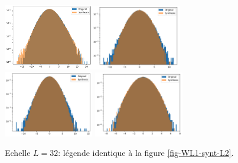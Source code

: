 \documentclass[12pt,twoside]{article}
\begin{document}
\begin{figure}
\centering
\includegraphics[width=0.35\textwidth]{fig-WL1-synt-L32-pixelval.png}\includegraphics[width=0.35\textwidth]{fig-WL1-synt-L32-details_1.png}\\
\includegraphics[width=0.35\textwidth]{fig-WL1-synt-L32-details_2.png}
\includegraphics[width=0.35\textwidth]{fig-WL1-synt-L32-details_3.png}
\caption{Echelle $L=32$: légende identique à la figure \ref{fig-WL1-synt-L2}.}
\label{fig-WL1-synt-L32}
\end{figure}
\end{document}
